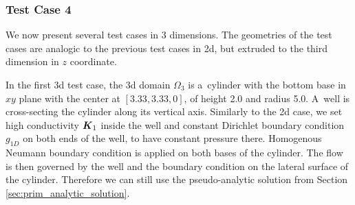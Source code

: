 %
%

\subsubsection{Test Case 4}
We now present several test cases in 3 dimensions. The geometries of the test cases
are analogic to the previous test cases in 2d, but extruded to the third dimension in $z$ coordinate.

In the first 3d test case, the 3d domain $\Omega_3$ is a~cylinder with the bottom base in $xy$ plane
with the center at $[3.33,3.33,0]$, of height 2.0 and radius 5.0.
A~well is cross-secting the cylinder along its vertical axis.
Similarly to the 2d case, we set high conductivity $\mathbf{\boldsymbol{K}}_1$ inside the well and constant Dirichlet boundary condition $g_{1D}$ on both ends of the well,
to have constant pressure there.
Homogenous Neumann boundary condition is applied on both bases of the cylinder. The flow is then governed 
by the well and the boundary condition on the lateral surface of the cylinder.
Therefore we can still use the pseudo-analytic solution from Section \ref{sec:prim_analytic_solution}.

